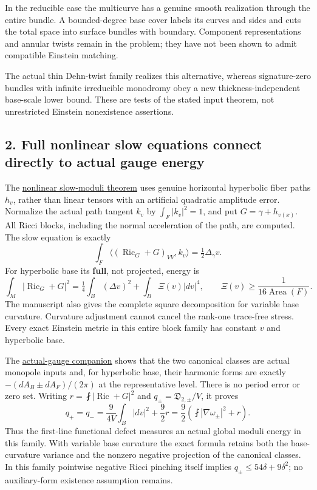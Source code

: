 \documentclass[
  11pt,
]{article}
\begin{document}
In the reducible case the multicurve has a genuine smooth realization
through the entire bundle. A bounded-degree base cover labels its curves
and sides and cuts the total space into surface bundles with boundary.
Component representations and annular twists remain in the problem; they
have not been shown to admit compatible Einstein matching.

The actual thin Dehn-twist family realizes this alternative, whereas
signature-zero bundles with infinite irreducible monodromy obey a new
thickness-independent base-scale lower bound. These are tests of the
stated input theorem, not unrestricted Einstein nonexistence assertions.

\hypertarget{full-nonlinear-slow-equations-connect-directly-to-actual-gauge-energy}{%
\subsection{2. Full nonlinear slow equations connect directly to actual
gauge
energy}\label{full-nonlinear-slow-equations-connect-directly-to-actual-gauge-energy}}

The \href{20260924_nonlinear_slow_moduli.md}{nonlinear slow-moduli
theorem} uses genuine horizontal hyperbolic fiber paths \(h_v\), rather
than linear tensors with an artificial quadratic amplitude error.
Normalize the actual path tangent \(k_v\) by \(\int_F|k_v|^2=1\), and
put \(G=\gamma+h_{v(x)}\). All Ricci blocks, including the normal
acceleration of the path, are computed. The slow equation is exactly \[
 \int_F\langle(\operatorname{Ric}_G+G)_{VV},k_v\rangle
                     =\tfrac12\Delta_\gamma v.
\] For hyperbolic base its \textbf{full}, not projected, energy is \[
 \boxed{\int_M|\operatorname{Ric}_G+G|^2
       =\tfrac14\int_B(\Delta v)^2+\int_B\Xi(v)|dv|^4,
       \qquad\Xi(v)\ge\frac1{16\operatorname{Area}(F)}.}
\] The manuscript also gives the complete square decomposition for
variable base curvature. Curvature adjustment cannot cancel the rank-one
trace-free stress. Every exact Einstein metric in this entire block
family has constant \(v\) and hyperbolic base.

The \href{20260924_moduli_energy_gauge.md}{actual-gauge companion} shows
that the two canonical classes are actual monopole inputs and, for
hyperbolic base, their harmonic forms are exactly
\(-(dA_B\pm dA_F)/(2\pi)\) at the representative level. There is no
period error or zero set. Writing \(r=\fint|\operatorname{Ric}+G|^2\)
and \(q_\pm=\mathfrak D_{2,\pm}/V\), it proves \[
 \boxed{q_+=q_-=\frac9{4V}\int_B|dv|^2+\frac92r
                 =\frac92\left(\fint|\nabla\omega_\pm|^2+r\right).}
\] Thus the first-line functional defect measures an actual global
moduli energy in this family. With variable base curvature the exact
formula retains both the base-curvature variance and the nonzero
negative projection of the canonical classes. In this family pointwise
negative Ricci pinching itself implies \(q_\pm\le54\delta+9\delta^2\);
no auxiliary-form existence assumption remains.
\end{document}
